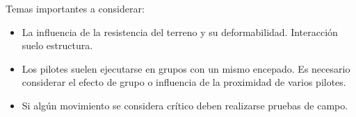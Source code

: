 Temas importantes a considerar:
\begin{itemize}
    \item La influencia de la resistencia del terreno y su deformabilidad. Interacción suelo estructura.
    \item Los pilotes suelen ejecutarse en grupos con un mismo encepado. Es necesario considerar el efecto de grupo o influencia de la proximidad de varios pilotes.
    \item Si algún movimiento se considera crítico deben realizarse pruebas de campo.
\end{itemize}

